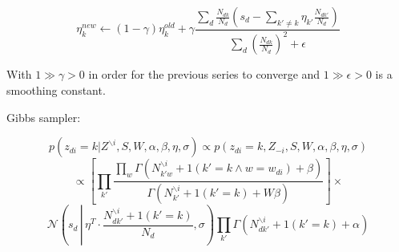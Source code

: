\documentclass[a4paper,10pt]{report}
\begin{document}
$$ \eta_k^{new} \leftarrow (1 - \gamma) \eta_k^{old} + \gamma \frac{\sum_d \frac{N_{dk}}{N_d} \left( s_d - \sum_{k' \ne k} \eta_{k'} \frac{N_{dk'}}{N_d} \right)}{\sum_d \left( \frac{N_{dk}}{N_d}  \right)^2 + \epsilon}$$

With $1 \gg \gamma > 0$ in order for the previous series to converge and $1 \gg \epsilon > 0$ is a smoothing constant.

Gibbs sampler:

$$ p(z_{di} = k | Z^{\backslash i}, S, W, \alpha, \beta, \eta, \sigma) \propto p(z_{di} = k, Z_{-i}, S, W, \alpha, \beta, \eta, \sigma) $$
$$ \propto \left[ \prod_{k'} \frac{\prod_w \Gamma(N_{{k'}w}^{\backslash i} + 1(k' = k \wedge w = w_{di}) + \beta)}{\Gamma(N_{k'}^{\backslash i} + 1(k' = k) + W \beta)} \right] \times $$
$$ \mathcal{N}\left(s_d\, \left|\, \eta^T \cdot \frac{N_{d{k'}}^{\backslash i} + 1(k' = k)}{N_d}, \sigma\right. \right) \prod_{k'} \Gamma(N_{d{k'}}^{\backslash i} + 1(k' = k) + \alpha) $$
\end{document}
